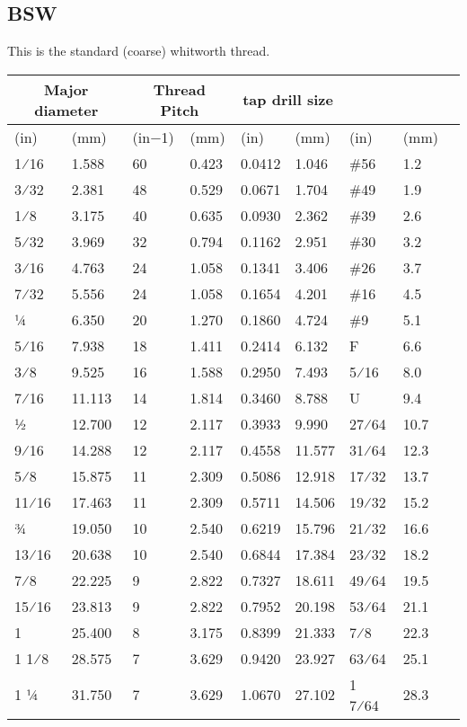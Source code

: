 \subsection{BSW}
This is the standard (coarse) whitworth thread.

\begin{table}[h!]
    \footnotesize
\begin{longtable}{lll|ll|llll}
\multicolumn{2}{c}{ Major diameter}
	&\multicolumn{2}{c}{Thread Pitch}
	&\multicolumn{2}{c}{tap drill size}
	\\

\hline
(in) &(mm) &(in−1) &(mm) &(in) &(mm) &(in) &(mm)\\
\hline
1⁄16 &1.588 &60 &0.423 &0.0412 &1.046 &\#56 &1.2\\
3⁄32 &2.381 &48 &0.529 &0.0671 &1.704 &\#49 &1.9\\
1⁄8 &3.175 &40 &0.635 &0.0930 &2.362 &\#39 &2.6\\
5⁄32 &3.969 &32 &0.794 &0.1162 &2.951 &\#30 &3.2\\
3⁄16 &4.763 &24 &1.058 &0.1341 &3.406 &\#26 &3.7\\
7⁄32 &5.556 &24 &1.058 &0.1654 &4.201 &\#16 &4.5\\
1⁄4 &6.350 &20 &1.270 &0.1860 &4.724 &\#9 &5.1\\
5⁄16 &7.938 &18 &1.411 &0.2414 &6.132 &F &6.6\\
3⁄8 &9.525 &16 &1.588 &0.2950 &7.493 &5⁄16 &8.0\\
7⁄16 &11.113 &14 &1.814 &0.3460 &8.788 &U &9.4\\
1⁄2 &12.700 &12 &2.117 &0.3933 &9.990 &27⁄64 &10.7\\
9⁄16 &14.288 &12 &2.117 &0.4558 &11.577 &31⁄64 &12.3\\
5⁄8 &15.875 &11 &2.309 &0.5086 &12.918 &17⁄32 &13.7\\
11⁄16 &17.463 &11 &2.309 &0.5711 &14.506 &19⁄32 &15.2\\
3⁄4 &19.050 &10 &2.540 &0.6219 &15.796 &21⁄32 &16.6\\
13⁄16 &20.638 &10 &2.540 &0.6844 &17.384 &23⁄32 &18.2\\
7⁄8 &22.225 &9 &2.822 &0.7327 &18.611 &49⁄64 &19.5\\
15⁄16 &23.813 &9 &2.822 &0.7952 &20.198 &53⁄64 &21.1\\
1 &25.400 &8 &3.175 &0.8399 &21.333 &7⁄8 &22.3\\
1 1⁄8 &28.575 &7 &3.629 &0.9420 &23.927 &63⁄64 &25.1\\
1 1⁄4 &31.750 &7 &3.629 &1.0670 &27.102 &1 7⁄64 &28.3\\

\end{longtable}
\end{table}
